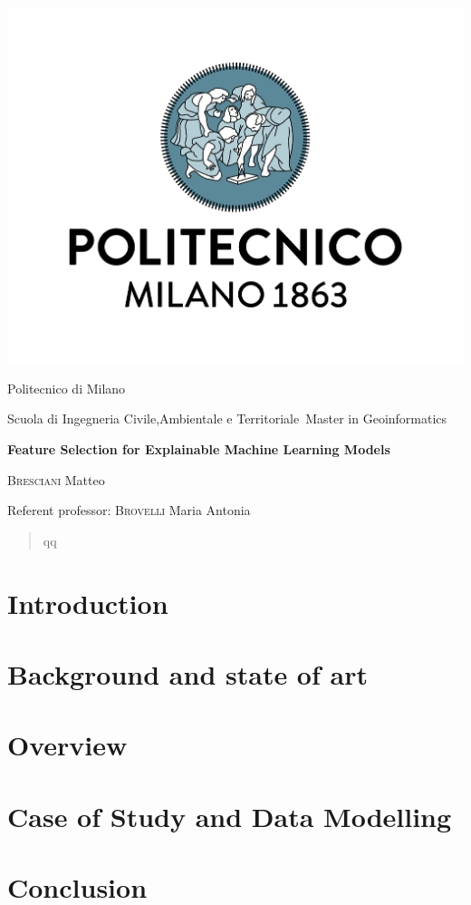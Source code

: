 \documentclass[fontsize=12pt,paper=a4,pagesize=auto]{report}
\begin{document}
\begin{titlepage}
	\centering
	\includegraphics[scale = 0.20]{images/polimi.jpg}\par
	{\Large
		Politecnico di Milano\par
		Scuola di Ingegneria Civile,Ambientale e Territoriale\
		Master in Geoinformatics\par}
			\vspace{0.5cm}
	{\huge\bfseries
		Feature Selection for Explainable Machine Learning Models\\\par}
	\vspace{1cm}
	{\Large
		{\scshape Bresciani} Matteo\par}
	\vfill
	Referent professor: {\scshape Brovelli} Maria Antonia\par
	\vfill
\end{titlepage}




\begin{abstract}

qq
\end{abstract}
\tableofcontents

\chapter{Introduction}
 

\chapter{Background and state of art}


\chapter{Overview}
 \label{chap:Overview}
 

\chapter{Case of Study and Data Modelling }
 \label{chap:case}


\chapter{Conclusion}




       
\end{document}
